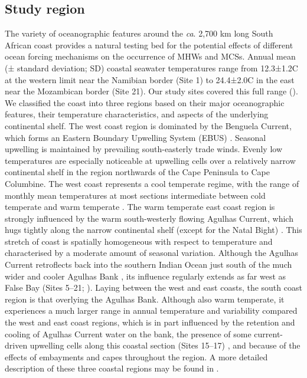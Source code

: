 \documentclass[a4paper,10pt,review]{elsarticle}
\begin{document}
\subsection{Study region}
The variety of oceanographic features around the \emph{ca}. 2,700 km long South African coast provides a natural testing bed for the potential effects of different ocean forcing mechanisms on the occurrence of MHWs and MCSs. Annual mean (± standard deviation; SD) coastal seawater temperatures range from 12.3±1.2\degree C at the western limit near the Namibian border (Site 1) to 24.4±2.0\degree C in the east near the Mozambican border (Site 21). Our study sites covered this full range (). We classified the coast into three regions based on their major oceanographic features, their temperature characteristics, and aspects of the underlying continental shelf. The west coast region is dominated by the Benguela Current, which forms an Eastern Boundary Upwelling System (EBUS) \citep{Hutchings2009}. Seasonal upwelling is maintained by prevailing south-easterly trade winds. Evenly low temperatures are especially noticeable at upwelling cells over a relatively narrow continental shelf in the region northwards of the Cape Peninsula to Cape Columbine. The west coast represents a cool temperate regime, with the range of monthly mean temperatures at most sections intermediate between cold temperate and warm temperate \citep{Luning1990}. The warm temperate east coast region is strongly influenced by the warm south-westerly flowing Agulhas Current, which hugs tightly along the narrow continental shelf (except for the Natal Bight) \citep{Luning1990}. This stretch of coast is spatially homogeneous with respect to temperature and characterised by a moderate amount of seasonal variation. Although the Agulhas Current retroflects back into the southern Indian Ocean \citep{Hutchings2009} just south of the much wider and cooler Agulhas Bank \citep{Roberts2005}, its influence regularly extends as far west as False Bay (Sites 5--21; ). Laying between the west and east coasts, the south coast region is that overlying the Agulhas Bank. Although also warm temperate, it experiences a much larger range in annual temperature and variability compared the west and east coast regions, which is in part influenced by the retention and cooling of Agulhas Current water on the bank, the presence of some current-driven upwelling cells along this coastal section (Sites 15--17) \citep{Roberts2005}, and because of the effects of embayments and capes throughout the region. A more detailed description of these three coastal regions may be found in \citet{Smit2013}.
\end{document}
